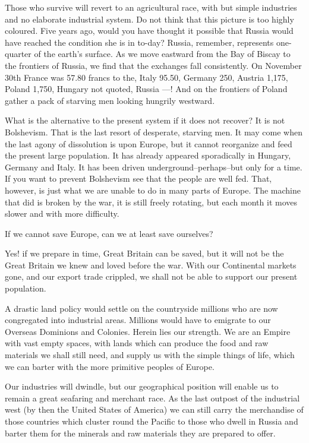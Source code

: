 \documentclass{book}
\begin{document}
Those who survive will revert to an agricultural race, with but simple industries and no elaborate industrial system. Do not think that this picture is too highly coloured. Five years ago, would you have thought it possible that Russia would have reached the condition she is in to-day? Russia, remember, represents one-quarter of the earth’s surface. As we move eastward from the Bay of Biscay to the frontiers of Russia, we find that the exchanges fall consistently. On November 30th France was 57.80 francs to the, Italy 95.50, Germany 250, Austria 1,175, Poland 1,750, Hungary not quoted, Russia —! And on the frontiers of Poland gather a pack of starving men looking hungrily westward.

What is the alternative to the present system if it does not recover? It is not Bolshevism. That is the last resort of desperate, starving men. It may come when the last agony of dissolution is upon Europe, but it cannot reorganize and feed the present large population. It has already appeared sporadically in Hungary, Germany and Italy. It has been driven underground–perhaps–but only for a time. If you want to prevent Bolshevism see that the people are well fed. That, however, is just what we are unable to do in many parts of Europe. The machine that did is broken by the war, it is still freely rotating, but each month it moves slower and with more difficulty.

If we cannot save Europe, can we at least save ourselves?

Yes! if we prepare in time, Great Britain can be saved, but it will not be the Great Britain we knew and loved before the war. With our Continental markets gone, and our export trade crippled, we shall not be able to support our present population.

A drastic land policy would settle on the countryside millions who are now congregated into industrial areas. Millions would have to emigrate to our Overseas Dominions and Colonies. Herein lies our strength. We are an Empire with vast empty spaces, with lands which can produce the food and raw materials we shall still need, and supply us with the simple things of life, which we can barter with the more primitive peoples of Europe.

Our industries will dwindle, but our geographical position will enable us to remain a great seafaring and merchant race. As the last outpost of the industrial west (by then the United States of America) we can still carry the merchandise of those countries which cluster round the Pacific to those who dwell in Russia and barter them for the minerals and raw materials they are prepared to offer.
\end{document}
